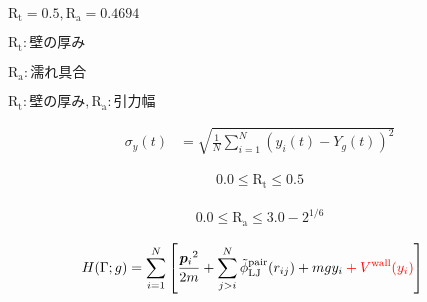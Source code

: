\documentclass[a4paper,11pt]{jsarticle}
\numberwithin{equation}{subsection}
\begin{document}
$\text{R}_\text{t} = 0.5, \text{R}_\text{a} = 0.4694$

$\text{R}_\text{t} \colon 壁の厚み$

$\text{R}_\text{a} \colon 濡れ具合$

$\text{R}_\text{t} \colon 壁の厚み, \text{R}_\text{a} \colon 引力幅$

\begin{align}
  \sigma_{y} (t)
  &= \sqrt{\frac{1}{N} \sum_{i=1}^{N} (y_i (t) - Y_g (t) )^2} 
\end{align}

\begin{align}
  0.0 \leq \text{R}_\text{t} \leq 0.5
\end{align}

\begin{align}
  0.0 \leq \text{R}_\text{a} \leq 3.0 - 2^{1/6}
\end{align}

\begin{align}
  \label{Hamiltonian}
  H(\Gamma; g)
  &= \sum_{i=1}^{N}
  \left[
    \frac{{\bm{p}_i}^2}{2m} 
    + \sum_{j > i}^{N}
      \tilde{\phi}_{\text{LJ}}^{\text{pair}}(r_{ij})
    + mgy_i
    \color{red}+ V^{\text{wall}} (y_i)\color{black}
  \right]
\end{align}
\end{document}
